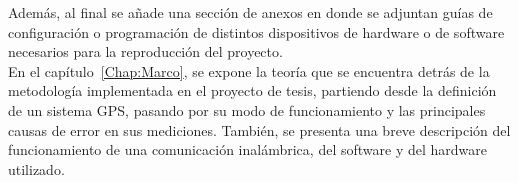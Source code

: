 Además, al final se añade una sección de anexos en donde se adjuntan guías de configuración o programación de distintos dispositivos de hardware o de software necesarios para la reproducción del proyecto.\\

En el capítulo~\ref{Chap:Marco}, se expone la teoría que se encuentra detrás de la metodología implementada en el proyecto de tesis, partiendo desde la definición de un sistema GPS, pasando por su modo de funcionamiento y las principales causas de error en sus mediciones. También, se presenta una breve descripción del funcionamiento de una comunicación inalámbrica, del software y del hardware utilizado.